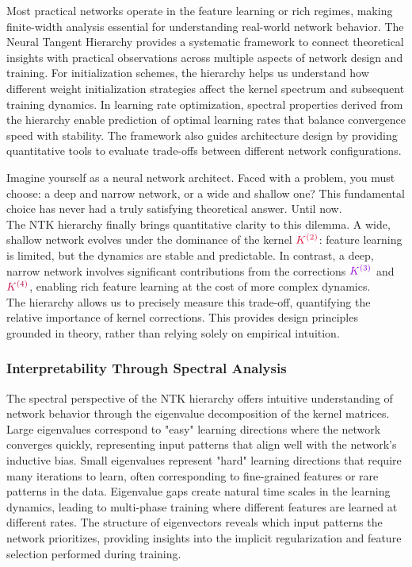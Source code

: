 \documentclass[a4paper]{article}
\theoremstyle{plain}
\theoremstyle{definition}
\theoremstyle{remark}
\begin{document}
Most practical networks operate in the feature learning or rich regimes, making finite-width analysis essential for understanding real-world network behavior. The Neural Tangent Hierarchy provides a systematic framework to connect theoretical insights with practical observations across multiple aspects of network design and training. For initialization schemes, the hierarchy helps us understand how different weight initialization strategies affect the kernel spectrum and subsequent training dynamics. In learning rate optimization, spectral properties derived from the hierarchy enable prediction of optimal learning rates that balance convergence speed with stability. The framework also guides architecture design by providing quantitative tools to evaluate trade-offs between different network configurations.

\begin{tcolorbox}[colback=red!10,colframe=red!80!black,title={\textbf{An Architect's Choice: Depth or Width?}},enhanced,drop shadow]
Imagine yourself as a neural network architect. Faced with a problem, you must choose: a deep and narrow network, or a wide and shallow one? This fundamental choice has never had a truly satisfying theoretical answer. Until now.\\

The NTK hierarchy finally brings quantitative clarity to this dilemma. A wide, shallow network evolves under the dominance of the kernel $\textcolor{kernelcolor}{K^{(2)}}$: feature learning is limited, but the dynamics are stable and predictable. In contrast, a deep, narrow network involves significant contributions from the corrections $\textcolor{k3color}{K^{(3)}}$ and $\textcolor{purple}{K^{(4)}}$, enabling rich feature learning at the cost of more complex dynamics.\\

The hierarchy allows us to precisely measure this trade-off, quantifying the relative importance of kernel corrections. This provides design principles grounded in theory, rather than relying solely on empirical intuition.
\end{tcolorbox}

\subsubsection{Interpretability Through Spectral Analysis}

The spectral perspective of the NTK hierarchy offers intuitive understanding of network behavior through the eigenvalue decomposition of the kernel matrices. Large eigenvalues correspond to "easy" learning directions where the network converges quickly, representing input patterns that align well with the network's inductive bias. Small eigenvalues represent "hard" learning directions that require many iterations to learn, often corresponding to fine-grained features or rare patterns in the data. Eigenvalue gaps create natural time scales in the learning dynamics, leading to multi-phase training where different features are learned at different rates. The structure of eigenvectors reveals which input patterns the network prioritizes, providing insights into the implicit regularization and feature selection performed during training.
\end{document}

